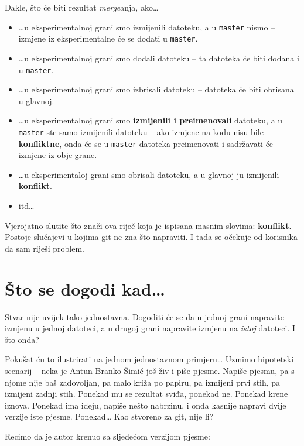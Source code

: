 Dakle, što će biti rezultat \emph{merge}anja, ako\dots

\begin{itemize}
	\item \dots{}u eksperimentalnoj grani smo izmijenili datoteku, a u \verb+master+ nismo -- izmjene iz eksperimentalne će se dodati u \verb+master+.
	\item \dots{}u eksperimentalnoj grani smo dodali datoteku -- ta datoteka će biti dodana i u \verb+master+.
	\item \dots{}u eksperimentalnoj grani smo izbrisali datoteku -- datoteka će biti obrisana u glavnoj.
	\item \dots{}u eksperimentalnoj grani smo \textbf{izmijenili i preimenovali} datoteku, a u \verb+master+ ste samo izmijenili datoteku -- ako izmjene na kodu nisu bile \textbf{konfliktne}, onda će se u \verb+master+ datoteka preimenovati i sadržavati će izmjene iz obje grane.
	\item \dots{}u eksperimentaloj grani smo obrisali datoteku, a u glavnoj ju izmijenili -- \textbf{konflikt}.
	\item itd\dots
\end{itemize}

Vjerojatno slutite što znači ova riječ koja je ispisana masnim slovima: \textbf{konflikt}.
Postoje slučajevi u kojima git ne zna što napraviti. 
I tada se očekuje od korisnika da sam riješi problem. 

\section*{Što se dogodi kad\dots}

Stvar nije uvijek tako jednostavna.
Dogoditi će se da u jednoj grani napravite izmjenu u jednoj datoteci, a u drugoj grani napravite izmjenu na \emph{istoj} datoteci.
I što onda?

Pokušat ću to ilustrirati na jednom jednostavnom primjeru\dots
Uzmimo hipotetski scenarij -- neka je Antun Branko Šimić još živ i piše pjesme.
Napiše pjesmu, pa s njome nije baš zadovoljan, pa malo križa po papiru, pa izmijeni prvi stih, pa izmijeni zadnji stih.
Ponekad mu se rezultat sviđa, ponekad ne.
Ponekad krene iznova.
Ponekad ima ideju, napiše nešto nabrzinu, i onda kasnije napravi dvije verzije iste pjesme.
Ponekad\dots
Kao stvoreno za git, nije li?

Recimo da je autor krenuo sa sljedećom verzijom pjesme:


